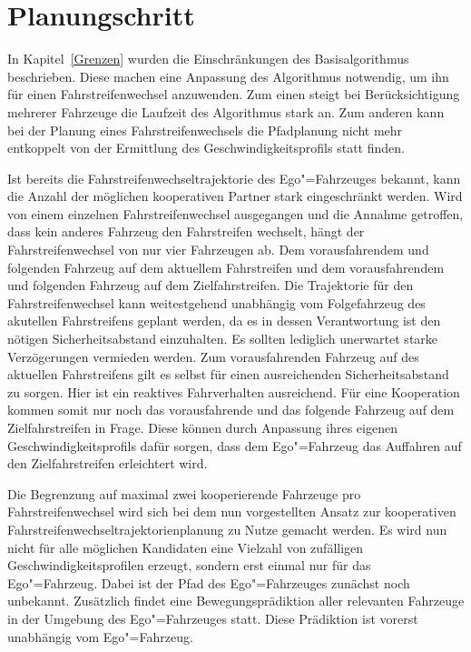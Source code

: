 \section{Planungschritt}
In Kapitel~\ref{Grenzen} wurden die Einschr\"ankungen des Basisalgorithmus beschrieben.
Diese machen eine Anpassung des Algorithmus notwendig, um ihn f\"ur einen Fahrstreifenwechsel anzuwenden.
Zum einen steigt bei Ber\"ucksichtigung mehrerer Fahrzeuge die Laufzeit des Algorithmus stark an.
Zum anderen kann bei der Planung eines Fahrstreifenwechsels die Pfadplanung nicht mehr entkoppelt von der Ermittlung des Geschwindigkeitsprofils statt finden.

Ist bereits die Fahrstreifenwechseltrajektorie des Ego"=Fahrzeuges bekannt, kann die Anzahl der m\"oglichen kooperativen Partner stark eingeschr\"ankt werden.
Wird von einem einzelnen Fahrstreifenwechsel ausgegangen und die Annahme getroffen, dass kein anderes Fahrzeug den Fahrstreifen wechselt, h\"angt der Fahrstreifenwechsel von nur vier Fahrzeugen ab.
Dem vorausfahrendem und folgenden Fahrzeug auf dem aktuellem Fahrstreifen und dem vorausfahrendem und folgenden Fahrzeug auf dem Zielfahrstreifen.
Die Trajektorie f\"ur den Fahrstreifenwechsel kann weitestgehend unabh\"angig vom Folgefahrzeug des akutellen Fahrstreifens geplant werden, da es in dessen Verantwortung ist den n\"otigen Sicherheitsabstand einzuhalten.
Es sollten lediglich unerwartet starke Verz\"ogerungen vermieden werden.
Zum vorausfahrenden Fahrzeug auf des aktuellen Fahrstreifens gilt es selbst f\"ur einen ausreichenden Sicherheitsabstand zu sorgen.
Hier ist ein reaktives Fahrverhalten ausreichend.
F\"ur eine Kooperation kommen somit nur noch das vorausfahrende und das folgende Fahrzeug auf dem Zielfahrstreifen in Frage.
Diese k\"onnen durch Anpassung ihres eigenen Geschwindigkeitsprofils daf\"ur sorgen, dass dem Ego"=Fahrzeug das Auffahren auf den Zielfahrstreifen erleichtert wird.

Die Begrenzung auf maximal zwei kooperierende Fahrzeuge pro Fahrstreifenwechsel wird sich bei dem nun vorgestellten Ansatz zur kooperativen Fahrstreifenwechseltrajektorienplanung zu Nutze gemacht werden.
Es wird nun nicht f\"ur alle m\"oglichen Kandidaten eine Vielzahl von zuf\"alligen Geschwindigkeitsprofilen erzeugt, sondern erst einmal nur f\"ur das Ego"=Fahrzeug.
Dabei ist der Pfad des Ego"=Fahrzeuges zun\"achst noch unbekannt.
Zus\"atzlich findet eine Bewegungspr\"adiktion aller relevanten Fahrzeuge in der Umgebung des Ego"=Fahrzeuges statt.
Diese Pr\"adiktion ist vorerst unabh\"angig vom Ego"=Fahrzeug.


